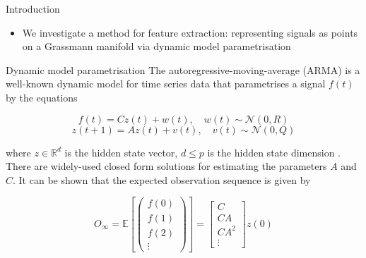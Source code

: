 \documentclass[final]{beamer}
\newlength{\onecolwid}
\begin{document}
\begin{frame}[t]
\begin{columns}[t]
\begin{column}{\onecolwid}
\begin{block}{Introduction}
\begin{itemize}
\begin{itemize}
\end{itemize}
 
        \item We investigate a  method for feature extraction: representing signals as points
            on a Grassmann manifold via dynamic model parametrisation
    \end{itemize}
\end{block}


\begin{block}{Dynamic model parametrisation}
    The autoregressive-moving-average (ARMA) is a well-known dynamic model for time series data that
    parametrises a signal $f(t)$ by the equations

    \begin{equation}
        f(t) = Cz(t) + w(t), \quad w(t) \sim \mathcal{N}(0, R)
    \end{equation}
    \begin{equation}
        z(t + 1) = Az(t) + v(t), \quad v(t) \sim \mathcal{N}(0, Q)
    \end{equation}

    where $z \in \mathbb{R}^d$ is the hidden state vector, $d \leq p$ is the hidden state dimension
    \cite{turaga_statistical_2011}. 
    There are widely-used closed form solutions for estimating the
    parameters $A$ and $C$. It can be shown that the expected observation sequence is given by

    \begin{equation}\label{eq:observation}
        O_\infty = \mathbb{E}\left[\begin{pmatrix} f(0) \\ f(1) \\ f(2) \\ \vdots
            \end{pmatrix}\right] = \begin{bmatrix} C \\ CA \\ CA^2 \\ \vdots \end{bmatrix} z(0)
    \end{equation}
\end{block}



\end{column}
\end{columns}
\end{frame}
\end{document}
